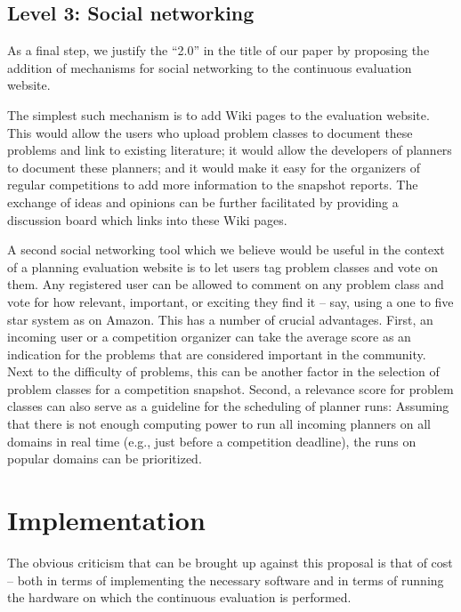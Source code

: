\subsection{Level 3: Social networking}

As a final step, we justify the ``2.0'' in the title of our paper by
proposing the addition of mechanisms for social networking to the
continuous evaluation website.

The simplest such mechanism is to add Wiki pages to the evaluation
website.  This would allow the users who upload problem classes to
document these problems and link to existing literature; it would
allow the developers of planners to document these planners; and it
would make it easy for the organizers of regular competitions to add
more information to the snapshot reports.  The exchange of ideas and
opinions can be further facilitated by providing a discussion board
which links into these Wiki pages.

A second social networking tool which we believe would be useful in
the context of a planning evaluation website is to let users tag
problem classes and vote on them.  Any registered user can be allowed
to comment on any problem class and vote for how relevant, important,
or exciting they find it -- say, using a one to five star system as on
Amazon.  This has a number of crucial advantages.  First, an incoming
user or a competition organizer can take the average score as an
indication for the problems that are considered important in the
community.  Next to the difficulty of problems, this can be another
factor in the selection of problem classes for a competition snapshot.
Second, a relevance score for problem classes can also serve as a
guideline for the scheduling of planner runs: Assuming that there is
not enough computing power to run all incoming planners on all domains
in real time (e.g., just before a competition deadline), the runs on
popular domains can be prioritized.





\section{Implementation}

The obvious criticism that can be brought up against this proposal is
that of cost -- both in terms of implementing the necessary software
and in terms of running the hardware on which the continuous
evaluation is performed.

